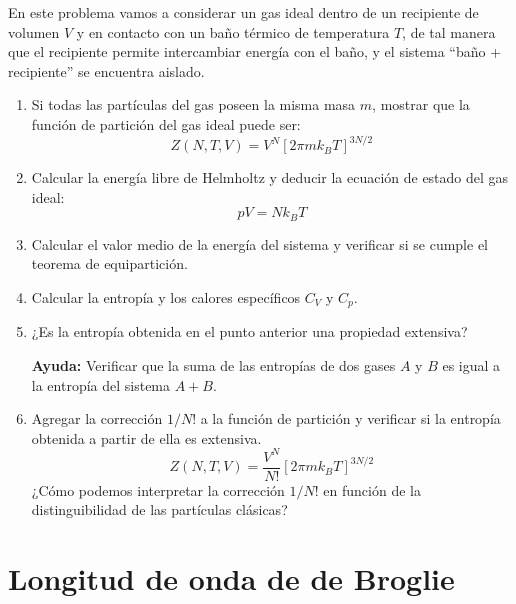 \documentclass[a4paper,11pt]{article}
\begin{document}
En este problema vamos a considerar un gas ideal dentro de un
recipiente de volumen $V$ y en contacto con un baño térmico de
temperatura $T$, de tal manera que el recipiente permite intercambiar
energía con el baño, y el sistema ``baño + recipiente'' se encuentra
aislado.

\begin{enumerate}[label=(\alph*),
                  leftmargin=2\parindent,
                  rightmargin=2\parindent]

    \item{\label{item:gas-ideal-particion}
          Si todas las partículas del gas poseen la misma masa $m$,
          mostrar que la función de partición del gas ideal puede ser:
          $$ Z(N, T, V) = V^N \left[ 2\pi m k_B T \right]^{3N/2} $$
          }

    \item{Calcular la energía libre de Helmholtz y deducir la ecuación de
          estado del gas ideal:
          $$ pV = N k_B T $$
          }

    \item{Calcular el valor medio de la energía del sistema y
          verificar si se cumple el teorema de equipartición.
          }

    \item{Calcular la entropía y los calores específicos $C_V$ y $C_p$.
          }

    \item{¿Es la entropía obtenida en el punto anterior una propiedad
          extensiva?
          }

    {\small
    \textbf{Ayuda:} Verificar que la suma de las entropías de dos
    gases $A$ y $B$ es igual a la entropía del sistema $A + B$.
    }

    \item{Agregar la corrección $1/N!$ a la función de partición y
          verificar si la entropía obtenida a partir de ella es extensiva.
          $$ Z(N, T, V) = \frac{V^N}{N!} \left[ 2\pi m k_B T \right]^{3N/2} $$
          ¿Cómo podemos interpretar la corrección $1/N!$ en función
          de la distinguibilidad de las partículas clásicas?
          }

\end{enumerate}


\section{Longitud de onda de de Broglie}
\label{sec:de-broglie}
\end{document}
